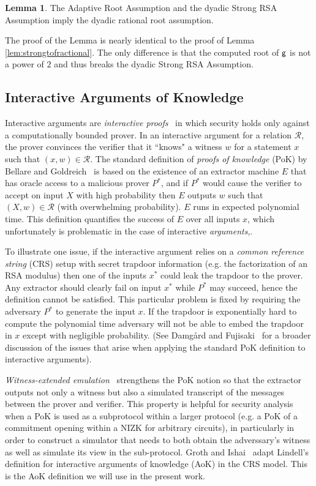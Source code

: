 \documentclass{article}
\theoremstyle{definition}
\newtheorem{lemma}{Lemma}
\begin{document}
\begin{lemma}
	The Adaptive Root Assumption and the dyadic Strong RSA Assumption imply the dyadic rational root assumption.
\end{lemma}
The proof of the Lemma is nearly identical to the proof of Lemma \ref{lem:strongtofractional}. The only difference is that the computed root of $\mathsf{g}$ is not a power of $2$ and thus breaks the dyadic Strong RSA Assumption.

\subsection{Interactive Arguments of Knowledge}
Interactive arguments are \emph{interactive proofs}~\cite{GolMicRac89} in which security holds only against a computationally bounded prover. In an interactive argument for a relation $\mathcal{R}$, the prover convinces the verifier that it ``knows" a witness $w$ for a statement $x$ such that $(x, w) \in \mathcal{R}$. The standard definition of \emph{proofs of knowledge} (PoK) by Bellare and Goldreich~\cite{C:BelGol92} is based on the existence of an extractor machine $E$ that has oracle access to a malicious prover $P^*$, and if $P^*$ would cause the verifier to accept on input $X$ with high probability then $E$ outputs $w$ such that $(X, w) \in \mathcal{R}$ (with overwhelming probability). $E$ runs in expected polynomial time. This definition quantifies the success of $E$ over all inputs $x$, which unfortunately is problematic in the case of interactive  \emph{arguments},.

To illustrate one issue, if the interactive argument relies on a \emph{common reference string} (CRS) setup with secret trapdoor information (e.g. the factorization of an RSA modulus) then one of the inputs $x^*$ could leak the trapdoor to the prover. Any extractor should clearly fail on input $x^*$ while $P^*$ may succeed, hence the definition cannot be satisfied. This particular problem is fixed by requiring the adversary $P^*$ to generate the input $x$. If the trapdoor is exponentially hard to compute the polynomial time adversary will not be able to embed the trapdoor in $x$ except with negligible probability. (See Damg\r{a}rd and Fujisaki~\cite{AC:DamFuj02} for a broader discussion of the issues that arise when applying the standard PoK definition to interactive arguments).

\emph{Witness-extended emulation}~\cite{EC:Lindell03} strengthens the PoK notion so that the extractor outputs not only a witness but also a simulated transcript of the messages between the prover and verifier. This property is helpful for security analysis when a PoK is used as a subprotocol within a larger protocol (e.g. a PoK of a commitment opening within a NIZK for arbitrary circuits), in particularly in order to construct a simulator that needs to both obtain the adverssary's witness as well as simulate its view in the sub-protocol. Groth and Ishai~\cite{EC:GroIsh08} adapt Lindell's definition for interactive arguments of knowledge (AoK) in the CRS model. This is the AoK definition we will use in the present work.
\end{document}
